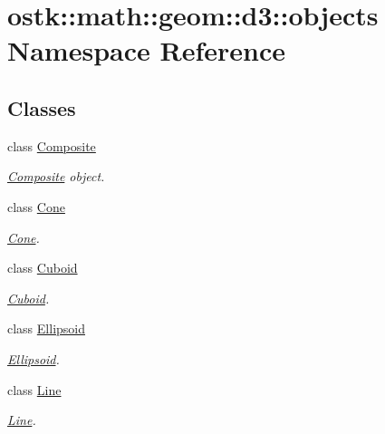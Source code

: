 \hypertarget{namespaceostk_1_1math_1_1geom_1_1d3_1_1objects}{}\section{ostk\+:\+:math\+:\+:geom\+:\+:d3\+:\+:objects Namespace Reference}
\label{namespaceostk_1_1math_1_1geom_1_1d3_1_1objects}
\subsection*{Classes}
\begin{DoxyCompactItemize}
\item 
class \hyperlink{classostk_1_1math_1_1geom_1_1d3_1_1objects_1_1_composite}{Composite}
\begin{DoxyCompactList}\small\item\em \hyperlink{classostk_1_1math_1_1geom_1_1d3_1_1objects_1_1_composite}{Composite} object. \end{DoxyCompactList}\item 
class \hyperlink{classostk_1_1math_1_1geom_1_1d3_1_1objects_1_1_cone}{Cone}
\begin{DoxyCompactList}\small\item\em \hyperlink{classostk_1_1math_1_1geom_1_1d3_1_1objects_1_1_cone}{Cone}. \end{DoxyCompactList}\item 
class \hyperlink{classostk_1_1math_1_1geom_1_1d3_1_1objects_1_1_cuboid}{Cuboid}
\begin{DoxyCompactList}\small\item\em \hyperlink{classostk_1_1math_1_1geom_1_1d3_1_1objects_1_1_cuboid}{Cuboid}. \end{DoxyCompactList}\item 
class \hyperlink{classostk_1_1math_1_1geom_1_1d3_1_1objects_1_1_ellipsoid}{Ellipsoid}
\begin{DoxyCompactList}\small\item\em \hyperlink{classostk_1_1math_1_1geom_1_1d3_1_1objects_1_1_ellipsoid}{Ellipsoid}. \end{DoxyCompactList}\item 
class \hyperlink{classostk_1_1math_1_1geom_1_1d3_1_1objects_1_1_line}{Line}
\begin{DoxyCompactList}\small\item\em \hyperlink{classostk_1_1math_1_1geom_1_1d3_1_1objects_1_1_line}{Line}. \end{DoxyCompactList}\item 

\end{DoxyCompactItemize}
